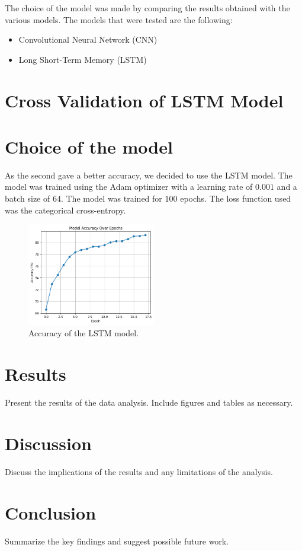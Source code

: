 \documentclass{article}
\begin{document}
The choice of the model was made by comparing the results obtained with the various models. The models that were tested are the following:
\begin{itemize}
    \item Convolutional Neural Network (CNN)
    \item Long Short-Term Memory (LSTM)
\end{itemize}

\section{Cross Validation of LSTM Model}



\section{Choice of the model}
\label{sec:model}

As the second gave a better accuracy, we decided to use the LSTM model. The model was trained using the Adam optimizer with a learning rate of $0.001$ and a batch size of $64$. The model was trained for $100$ epochs. The loss function used was the categorical cross-entropy.

\begin{figure}[htpb!]
    \centering
    \includegraphics[width=0.5\textwidth]{accuracy.png}
    \caption{Accuracy of the LSTM model.}
    \label{fig:loss}
\end{figure}

\section{Results}
\label{sec:results}
Present the results of the data analysis. Include figures and tables as necessary.


\section{Discussion}
\label{sec:discussion}
Discuss the implications of the results and any limitations of the analysis.

\section{Conclusion}
\label{sec:conclusion}
Summarize the key findings and suggest possible future work.
\end{document}
